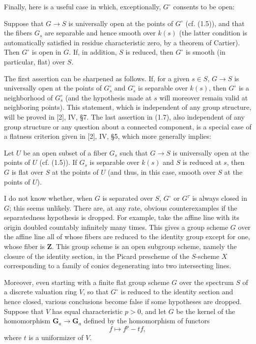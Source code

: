 Finally, here is a useful case in which, exceptionally, $G^\circ$ consents to
be open:

 Suppose that $G\longrightarrow S$ is universally open
at the points of $G^\circ$ (cf. (1.5)), and that the fibers $G_s$ are separable
and hence smooth over $k(s)$ (the latter condition is automatically satisfied
in residue characteristic zero, by a theorem of Cartier). Then $G^\circ$ is
open in $G$. If, in addition, $S$ is reduced, then $G^\circ$ is smooth (in
particular, flat) over $S$.

The first assertion can be sharpened as follows. If, for a given $s\in S$,
$G\longrightarrow S$ is universally open at the points of $G_s^\circ$ and
$G_s^\circ$ is separable over $k(s)$, then $G^\circ$ is a neighborhood of
$G_s^\circ$ (and the hypothesis made at $s$ will moreover remain valid at
neighboring points). This statement, which is independent of any group
structure, will be proved in [2], IV, §7. The last assertion in (1.7), also
independent of any group structure or any question about a connected
component, is a special case of a flatness criterion given in [2], IV, §5, which
more generally implies:

 Let $U$ be an open subset of a fiber $G_s$ such that
$G\longrightarrow S$ is universally open at the points of $U$ (cf. (1.5)). If
$G_s$ is separable over $k(s)$ and $S$ is reduced at $s$, then $G$ is flat over
$S$ at the points of $U$ (and thus, in this case, smooth over $S$ at the points
of $U$).

 I do not know whether, when $G$ is separated over $S$,
$G^\circ$ or $G^\tau$ is always closed in $G$; this seems unlikely. There are,
at any rate, obvious counterexamples if the separatedness hypothesis is
dropped. For example, take the affine line with its origin doubled countably
infinitely many times. This gives a group scheme $G$ over the affine line all
of whose fibers are reduced to the identity group except for one, whose fiber
is $\mathbf Z$. This group scheme is an open subgroup scheme, namely the
closure of the identity section, in the Picard prescheme of the $S$-scheme $X$
corresponding to a family of conics degenerating into two intersecting lines.

Moreover, even starting with a finite flat group scheme $G$ over the spectrum
$S$ of a discrete valuation ring $V$, so that $G^\circ$ is reduced to the
identity section and hence closed, various conclusions become false if some
hypotheses are dropped. Suppose that $V$ has equal characteristic $p>0$, and
let $G$ be the kernel of the homomorphism
$\mathbf G_a\longrightarrow\mathbf G_a$ defined by the homomorphism of
functors
\[
f\longmapsto f^p-tf,
\]
where $t$ is a uniformizer of $V$.

